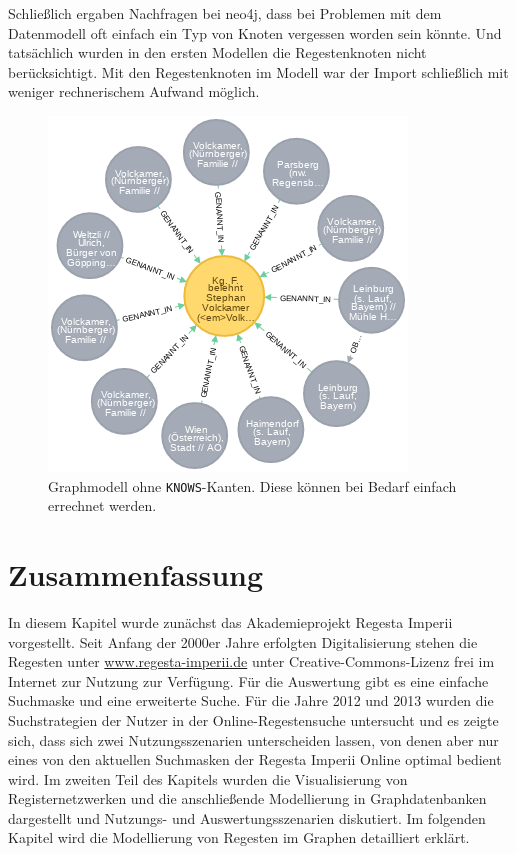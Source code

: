 \documentclass[ngerman,]{scrreprt}
\begin{document}
Schließlich ergaben Nachfragen bei neo4j, dass bei Problemen mit dem Datenmodell oft einfach ein Typ von Knoten vergessen worden sein könnte. Und tatsächlich wurden in den ersten Modellen die Regestenknoten nicht berücksichtigt. Mit den Regestenknoten im Modell war der Import schließlich mit weniger rechnerischem Aufwand möglich.

\begin{figure}
\centering
\includegraphics{Bilder/1zu1-Beziehungen-nur-Regest.png}
\caption{Graphmodell ohne \texttt{KNOWS}-Kanten. Diese können bei Bedarf einfach errechnet werden.}
\end{figure}

\hypertarget{zusammenfassung-1}{%
\section{Zusammenfassung}\label{zusammenfassung-1}}

In diesem Kapitel wurde zunächst das Akademieprojekt Regesta Imperii vorgestellt. Seit Anfang der 2000er Jahre erfolgten Digitalisierung stehen die Regesten unter \url{www.regesta-imperii.de} unter Creative-Commons-Lizenz frei im Internet zur Nutzung zur Verfügung. Für die Auswertung gibt es eine einfache Suchmaske und eine erweiterte Suche. Für die Jahre 2012 und 2013 wurden die Suchstrategien der Nutzer in der Online-Regestensuche untersucht und es zeigte sich, dass sich zwei Nutzungsszenarien unterscheiden lassen, von denen aber nur eines von den aktuellen Suchmasken der Regesta Imperii Online optimal bedient wird. Im zweiten Teil des Kapitels wurden die Visualisierung von Registernetzwerken und die anschließende Modellierung in Graphdatenbanken dargestellt und Nutzungs- und Auswertungsszenarien diskutiert. Im folgenden Kapitel wird die Modellierung von Regesten im Graphen detailliert erklärt.
\end{document}
